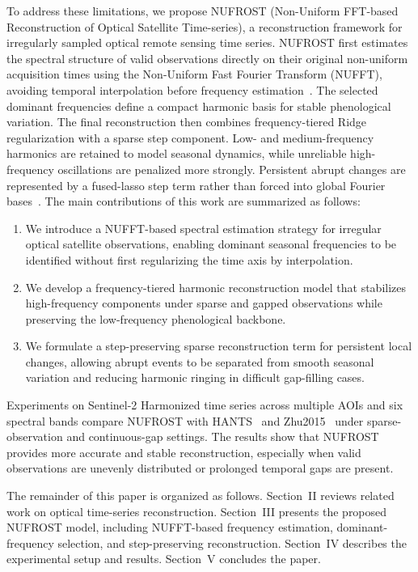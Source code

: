 \documentclass[letterpaper,journal]{IEEEtran}
\begin{document}
To address these limitations, we propose NUFROST (Non-Uniform FFT-based Reconstruction of Optical Satellite Time-series), a reconstruction framework for irregularly sampled optical remote sensing time series. NUFROST first estimates the spectral structure of valid observations directly on their original non-uniform acquisition times using the Non-Uniform Fast Fourier Transform (NUFFT), avoiding temporal interpolation before frequency estimation~\cite{ref4,ref6}. The selected dominant frequencies define a compact harmonic basis for stable phenological variation. The final reconstruction then combines frequency-tiered Ridge regularization with a sparse step component. Low- and medium-frequency harmonics are retained to model seasonal dynamics, while unreliable high-frequency oscillations are penalized more strongly. Persistent abrupt changes are represented by a fused-lasso step term rather than forced into global Fourier bases~\cite{ref9,ref15}. The main contributions of this work are summarized as follows:

\begin{enumerate}
    \item We introduce a NUFFT-based spectral estimation strategy for irregular optical satellite observations, enabling dominant seasonal frequencies to be identified without first regularizing the time axis by interpolation.
    \item We develop a frequency-tiered harmonic reconstruction model that stabilizes high-frequency components under sparse and gapped observations while preserving the low-frequency phenological backbone.
    \item We formulate a step-preserving sparse reconstruction term for persistent local changes, allowing abrupt events to be separated from smooth seasonal variation and reducing harmonic ringing in difficult gap-filling cases.
\end{enumerate}

Experiments on Sentinel-2 Harmonized time series across multiple AOIs and six spectral bands compare NUFROST with HANTS~\cite{ref10} and Zhu2015~\cite{ref14} under sparse-observation and continuous-gap settings. The results show that NUFROST provides more accurate and stable reconstruction, especially when valid observations are unevenly distributed or prolonged temporal gaps are present.

\IEEEpubidadjcol
The remainder of this paper is organized as follows. Section~II reviews related work on optical time-series reconstruction. Section~III presents the proposed NUFROST model, including NUFFT-based frequency estimation, dominant-frequency selection, and step-preserving reconstruction. Section~IV describes the experimental setup and results. Section~V concludes the paper.
\end{document}
